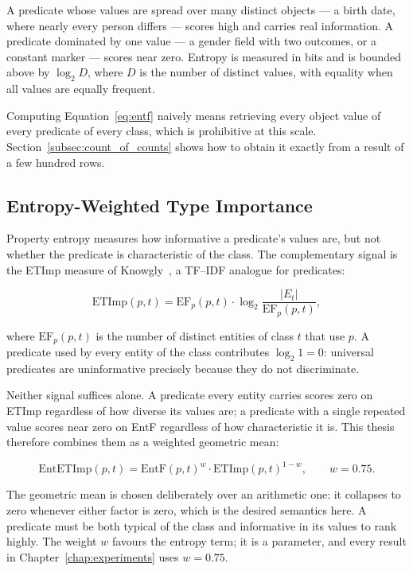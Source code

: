 A predicate whose values are spread over many distinct objects --- a birth date,
where nearly every person differs --- scores high and carries real information. A
predicate dominated by one value --- a gender field with two outcomes, or a
constant marker --- scores near zero. Entropy is measured in bits and is bounded
above by $\log_2 D$, where $D$ is the number of distinct values, with equality
when all values are equally frequent.

Computing Equation~\ref{eq:entf} naively means retrieving every object value of
every predicate of every class, which is prohibitive at this scale.
Section~\ref{subsec:count_of_counts} shows how to obtain it exactly from a
result of a few hundred rows.

\subsection{Entropy-Weighted Type Importance}

Property entropy measures how informative a predicate's values are, but not
whether the predicate is characteristic of the class. The complementary signal is
the \ac{ETImp} measure of Knowgly~\cite{garcia2025information}, a TF--IDF
analogue for predicates:

\begin{equation}
  \mathrm{ETImp}(p, t) = \mathrm{EF}_p(p, t) \cdot
    \log_2 \frac{|E_t|}{\mathrm{EF}_p(p, t)},
  \label{eq:etimp}
\end{equation}

where $\mathrm{EF}_p(p,t)$ is the number of distinct entities of class $t$ that
use $p$. A predicate used by every entity of the class contributes
$\log_2 1 = 0$: universal predicates are uninformative precisely because they do
not discriminate.

Neither signal suffices alone. A predicate every entity carries scores zero on
\ac{ETImp} regardless of how diverse its values are; a predicate with a single
repeated value scores near zero on \ac{EntF} regardless of how characteristic it
is. This thesis therefore combines them as a weighted geometric mean:

\begin{equation}
  \mathrm{EntETImp}(p, t) = \mathrm{EntF}(p, t)^{w} \cdot
                            \mathrm{ETImp}(p, t)^{1 - w},
  \qquad w = 0.75.
  \label{eq:entetimp}
\end{equation}

The geometric mean is chosen deliberately over an arithmetic one: it collapses to
zero whenever either factor is zero, which is the desired semantics here. A
predicate must be both typical of the class and informative in its values to rank
highly. The weight $w$ favours the entropy term; it is a parameter, and every
result in Chapter~\ref{chap:experiments} uses $w = 0.75$.

